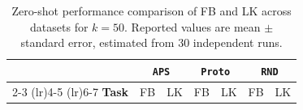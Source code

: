 \documentclass{article}
\theoremstyle{plain}
\theoremstyle{definition}
\theoremstyle{remark}
\begin{document}
\begin{table}
\centering
\caption{Zero-shot performance comparison of FB and LK across datasets for $k=50$. Reported values are mean $\pm$ standard error, estimated from 30 independent runs.}
\label{tab:zero_shot_fb_lk_datasets}

\setlength{\tabcolsep}{10pt}
\renewcommand{\arraystretch}{1.2}

\footnotesize

\begin{tabular}{l r r r r r r}
\toprule
 & \multicolumn{2}{c}{\texttt{APS}} 
 & \multicolumn{2}{c}{\texttt{Proto}} 
 & \multicolumn{2}{c}{\texttt{RND}} \\
\cmidrule(lr){2-3} \cmidrule(lr){4-5} \cmidrule(lr){6-7}
\textbf{Task} 
& \multicolumn{1}{c}{FB} 
& \multicolumn{1}{c}{LK} 
& \multicolumn{1}{c}{FB} 
& \multicolumn{1}{c}{LK} 
& \multicolumn{1}{c}{FB} 
& \multicolumn{1}{c}{LK} \\
\midrule


\end{tabular}
\end{table}
\end{document}
